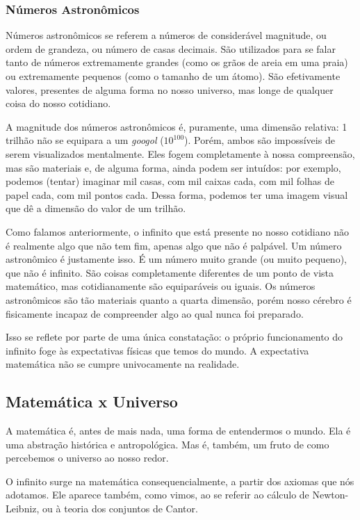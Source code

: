 \documentclass[journal,transmag]{IEEEtran}
\begin{document}
\subsubsection{Números Astronômicos}
Números astronômicos se referem a números de considerável magnitude, ou
ordem de grandeza, ou número de casas decimais. São utilizados para se falar
tanto de números extremamente grandes (como os grãos de areia em uma praia) ou
extremamente pequenos (como o tamanho de um átomo). São efetivamente valores,
presentes de alguma forma no nosso universo, mas longe de qualquer coisa do
nosso cotidiano.

A magnitude dos números astronômicos é, puramente, uma dimensão relativa: 1 trilhão não se equipara a
um \textit{googol} ($10^100$). Porém, ambos são impossíveis de serem visualizados
mentalmente. Eles fogem completamente à nossa compreensão, mas são materiais e,
de alguma forma, ainda podem ser intuídos: por exemplo,
podemos (tentar) imaginar mil casas, com mil caixas cada, com mil folhas de
papel cada, com mil pontos cada. Dessa forma, podemos ter uma imagem visual que
dê a dimensão do valor de um trilhão.

Como falamos anteriormente, o infinito que está presente no nosso cotidiano não
é realmente algo que não tem fim, apenas algo que não é palpável. Um número
astronômico é justamente isso. É um número muito grande (ou muito pequeno), que
não é infinito. São coisas completamente diferentes de um ponto de vista matemático,
mas cotidianamente são equiparáveis ou iguais. Os números astronômicos são tão
materiais quanto a quarta dimensão, porém nosso cérebro é fisicamente incapaz de
compreender algo ao qual nunca foi preparado.

Isso se reflete por parte de uma única constatação:
o próprio funcionamento do infinito foge às expectativas físicas que temos
do mundo. A expectativa matemática não se cumpre univocamente na realidade.


\subsection{Matemática x Universo}
A matemática é, antes de mais nada, uma forma de entendermos o mundo. Ela é
uma abstração histórica e antropológica. Mas é, também, um fruto de como
percebemos o universo ao nosso redor.

O infinito surge na matemática consequencialmente, a partir dos axiomas que
nós adotamos. Ele aparece também, como vimos, ao se referir ao cálculo de
Newton-Leibniz, ou à teoria dos conjuntos de Cantor.
\end{document}
